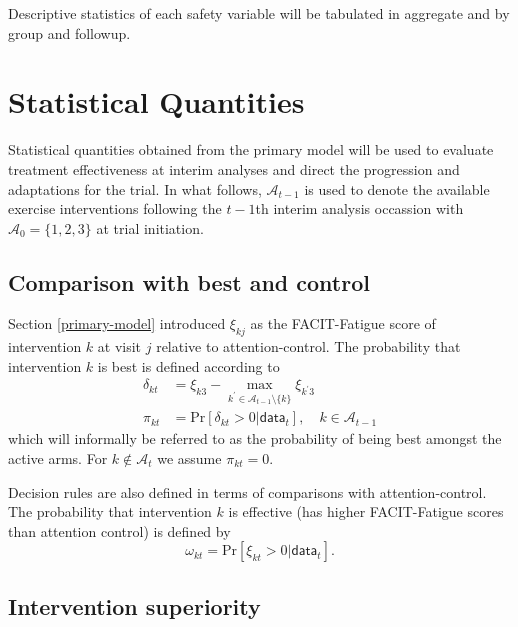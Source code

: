 \documentclass[
]{article}
\begin{document}
Descriptive statistics of each safety variable will be tabulated in aggregate and by group and followup.


\clearpage


\hypertarget{statistical-quantities}{%
  \section{Statistical Quantities}\label{statistical-quantities}}

Statistical quantities obtained from the primary model will be used to evaluate treatment effectiveness at interim analyses and direct the progression and adaptations for the trial.
In what follows, $\mathcal{A}_{t-1}$ is used to denote the available exercise interventions following the $t-1$th interim analysis occassion with $\mathcal{A}_0=\{1,2,3\}$ at trial initiation.

\hypertarget{comparison-wth-best}{%
  \subsection{Comparison with best and control}\label{comparison-wth-best}}

Section \ref{primary-model} introduced $\xi_{kj}$ as the FACIT-Fatigue score of intervention $k$ at visit $j$ relative to attention-control.
The probability that intervention $k$ is best is defined according to
$$
  \begin{aligned}
    \delta_{kt} &= \xi_{k3} - \underset{k^\prime\in\mathcal{A}_{t-1}\setminus\{k\}}{\max}\xi_{k^\prime 3} \\
    \pi_{kt} & = \text{Pr}[\delta_{kt}>0|\mathsf{data}_t], \quad k \in \mathcal{A}_{t-1}
  \end{aligned}
$$
which will informally be referred to as the probability of being best amongst the active arms.
For $k\notin\mathcal{A}_t$ we assume $\pi_{kt}=0$.

Decision rules are also defined in terms of comparisons with attention-control. 
The probability that intervention $k$ is effective (has higher FACIT-Fatigue scores than attention control) is defined by
$$
  \omega_{kt} = \text{Pr}[\xi_{kt} > 0 | \mathsf{data}_t].
$$

\hypertarget{intervention-superiority}{%
  \subsection{Intervention superiority}\label{intervention-superiority}}
\end{document}
